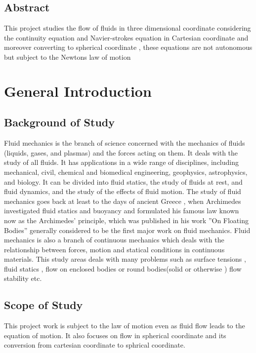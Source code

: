 \documentclass[a4paper, 12pt]{report}
\begin{document}
\newpage
\begin{center}
\section*{Abstract}
\end{center}
This project studies the flow of fluids in three dimensional coordinate considering the continuity equation and Navier-strokes equation in Cartesian coordinate and moreover converting to spherical coordinate , these equations are not autonomous but subject to the Newtons law of motion




\newpage
{}
\tableofcontents

\chapter{General Introduction}
\section{Background of Study}

Fluid mechanics is the branch of science concerned with the mechanics of fluids (liquids, gases, and plasmas) and the forces acting on them. It deals with the study of all fluids. It has applications in a wide range of disciplines, including mechanical, civil, chemical and biomedical engineering, geophysics, astrophysics, and biology. 
It can be divided into fluid statics, the study of fluids at rest, and fluid dynamics, and the study of the effects of fluid motion. 
The study of ﬂuid mechanics goes back at least to the days of ancient Greece , when Archimedes investigated ﬂuid statics and buoyancy and formulated his famous law known now as the Archimedes’ principle, which was published in his work ”On Floating Bodies” generally considered to be the ﬁrst major work on ﬂuid mechanics.
Fluid mechanics is also a branch of continuous mechanics which deals with the relationship between forces, motion and statical conditions in continuous materials. This study areas deals with many problems such as surface tensions , fluid statics , flow on enclosed bodies or round bodies(solid or otherwise ) flow stability etc.


\newpage
\section{Scope of Study}
This project work is subject to the law of motion even as fluid flow leads to the equation of motion. It also focuses on flow in spherical coordinate and its conversion from cartesian coordinate to sphrical coordinate.
\end{document}
